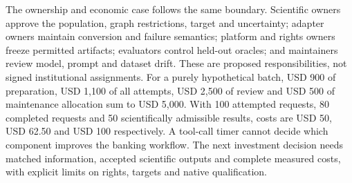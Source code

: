 The ownership and economic case follows the same boundary. Scientific owners
approve the population, graph restrictions, target and uncertainty; adapter
owners maintain conversion and failure semantics; platform and rights owners
freeze permitted artifacts; evaluators control held-out oracles; and maintainers
review model, prompt and dataset drift. These are proposed responsibilities,
not signed institutional assignments. For a purely hypothetical batch, USD 900
of preparation, USD 1,100 of all attempts, USD 2,500 of review and USD 500 of
maintenance allocation sum to USD 5,000. With 100 attempted requests, 80
completed requests and 50 scientifically admissible results, costs are USD 50,
USD 62.50 and USD 100 respectively. A tool-call timer cannot decide which
component improves the banking workflow. The next investment decision needs
matched information, accepted scientific outputs and complete measured costs,
with explicit limits on rights, targets and native qualification.~\citep{exec25_agents_choice}
